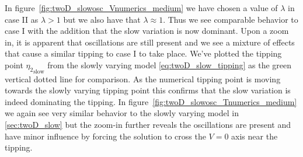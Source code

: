 \indent In figure~\ref{fig:twoD_slowosc_Vnumerics_medium} we have chosen a value of $\lambda$ in case II as $\lambda>1$ but we also have that $\lambda\approx 1$. Thus we see comparable behavior to case I with the addition that the slow variation is now dominant. Upon a zoom in, it is apparent that oscillations are still present and we see a mixture of effects that cause a similar tipping to case I to take place. We've plotted the tipping point ${\eta_2}_{\text{slow}}$ from the slowly varying model \eqref{eq:twoD_slow_tipping} as the green vertical dotted line for comparison. As the numerical tipping point is moving towards the slowly varying tipping point this confirms that the slow variation is indeed dominating the tipping. In figure~\ref{fig:twoD_slowosc_Tnumerics_medium} we again see very similar behavior to the slowly varying model in \autoref{sec:twoD_slow} but the zoom-in further reveals the oscillations are present and have minor influence by forcing the solution to cross the $V=0$ axis near the tipping.

